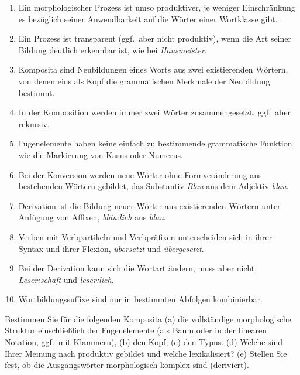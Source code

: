 \Zusammenfassung

\begin{enumerate}\Lf
  \item Ein morphologischer Prozess ist umso produktiver, je weniger Einschränkung es bezüglich seiner Anwendbarkeit auf die Wörter einer Wortklasse gibt.
  \item Ein Prozess ist transparent (ggf.\ aber nicht produktiv), wenn die Art seiner Bildung deutlich erkennbar ist, wie bei \textit{Hausmeister}.
  \item Komposita sind Neubildungen eines Worts aus zwei existierenden Wörtern, von denen eins als Kopf die grammatischen Merkmale der Neubildung bestimmt.
  \item In der Komposition werden immer zwei Wörter zusammengesetzt, ggf.\ aber rekursiv.
  \item Fugenelemente haben keine einfach zu bestimmende grammatische Funktion wie die Markierung von Kasus oder Numerus.
  \item Bei der Konversion werden neue Wörter ohne Formveränderung aus bestehenden Wörtern gebildet, \zB das Substantiv \textit{Blau} aus dem Adjektiv \textit{blau}.
  \item Derivation ist die Bildung neuer Wörter aus existierenden Wörtern unter Anfügung von Affixen, \zB \textit{bläu:lich} aus \textit{blau}.
  \item Verben mit Verbpartikeln und Verbpräfixen unterscheiden sich in ihrer Syntax und ihrer Flexion, \zB \textit{übersetzt} und \textit{übergesetzt}.
  \item Bei der Derivation kann sich die Wortart ändern, muss aber nicht, \zB \textit{Leser:schaft} und \textit{leser:lich}.
  \item Wortbildungssuffixe sind nur in bestimmten Abfolgen kombinierbar.
\end{enumerate}

\Uebungen

\Uebung \label{u71} Bestimmen Sie für die folgenden Komposita (a) die vollständige morphologische Struktur einschließlich der Fugenelemente (als Baum oder in der linearen Notation, ggf.\ mit Klammern), (b) den Kopf, (c) den Typus. (d) Welche sind Ihrer Meinung nach produktiv gebildet und welche lexikalisiert? (e) Stellen Sie fest, ob die Ausgangswörter morphologisch komplex sind (\zB deriviert).

